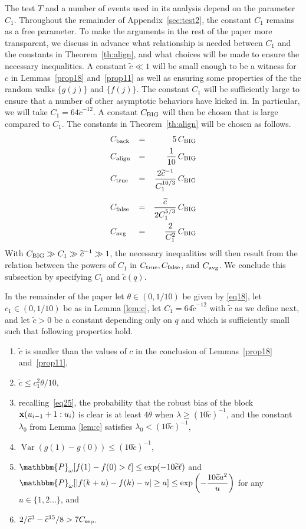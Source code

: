 \documentclass[final,12pt]{colt2018} %
\renewcommand{\P}{\mathbbm{P}}
\newcommand{\1}{\mathbf{1}}
\DeclareMathOperator{\Var}{Var}
\def\disp{\displaystyle}
\newcommand{\wt}{\widetilde}
\def\x{{\bf x}}
\def\csep{C_{\rm sep}} %
\def\cback{C_{\rm back}}
\def\calign{C_{\rm align}}
\def\ctrue{C_{\rm true}}
\def\cfalse{C_{\rm false}}
\def\cavg{C_{\rm avg}}
\def\ct{{\wt c}}
\def\chuge{C_{\rm BIG}}
\begin{document}
The test $T$ and a number of events used in its analysis depend on
the parameter $C_1$.  Throughout the remainder of Appendix~\ref{sec:test2},
the constant $C_1$ remains as a free parameter.  To make the arguments
in the rest of the paper more transparent, we discuss in advance what
relationship is needed between $C_1$ and the constants in
Theorem~\ref{th:align}, and what choices will be made to ensure the
necessary inequalities.
%
A constant $\ct \ll 1$ will be small enough to be a witness for $c$
in Lemmas~\ref{prop18} and~\ref{prop11} as well as ensuring some
properties of the the random walks $\{ g(j) \}$ and $\{ f(j) \}$.
The constant $C_1$ will be sufficiently large to ensure that a number
of other asymptotic behaviors have kicked in.  In particular, we will take
$C_1 = 64 \ct^{-12}$.  A constant $\chuge$ will then be chosen that is
large compared to $C_1$.  The constants in Theorem~\ref{th:align} will
be chosen as follows.
%
$$\begin{array}{lcr}
\cback & = & {\disp 5 \, \chuge} \\[1ex]
\calign & = & {\disp \frac{1}{10} \, \chuge } \\[2ex]
\ctrue & = & {\disp \frac{2 \ct^{-1}}{C_1^{10/3}} \, \chuge } \\[4ex]
\cfalse & = & {\disp \frac{\ct}{2 C_1^{5/3}} \, \chuge } \\[3ex]
\cavg & = & {\disp \frac{2}{C_1^2} \, \chuge }
\end{array}$$
With $\chuge \gg C_1 \gg \ct^{-1} \gg 1$, the necessary inequalities
will then result from the relation between the powers of $C_1$ in
$\ctrue, \cfalse$, and $\cavg$.
%
We conclude this subsection by specifying $C_1$ and $\ct (q)$.
%
\begin{definition} \label{def3}
	In the remainder of the paper let $\theta \in (0,1/10)$ be given by \eqref{eq18}, let $c_1\in(0,1/10)$ be as in Lemma \ref{lem:c}, let $C_1=64\wt c^{-12}$ with $\wt c$ as we define next, and let $\ct >0$ be a constant depending only on $q$ and which is sufficiently small such that following properties hold.
	\begin{enumerate}[$(i)$]
		\item $\ct$ is smaller than the values of $c$ in the conclusion of
		Lemmas~\ref{prop18} and~\ref{prop11},
		\label{rr:i}
		\item $\ct \leq c_1^2 \theta / 10$,
		\label{rr:ii}
		\item recalling~\eqref{eq25}, the probability that the robust bias
		of the block $\x (u_{i-1} + 1 : u_i)$ is clear is at least $4 \theta$
		when $\lambda \geq (10 \ct)^{-1}$, and the constant $\lambda_0$ from Lemma \ref{lem:c} satisfies $\lambda_0<(10\ct)^{-1}$,
		\label{rr:iii}
		\item $\Var(g(1) - g(0)) \leq (10 \ct)^{-1}$,
		\label{rr:iv}
		\item $\P_\omega [f(1)-f(0) > \ell] \leq \exp(-10 \ct \ell)$ and
		$\disp \P_\omega [|f(k + u) - f(k) - u| \geq a] \leq
		\exp \left (- \frac{10 \ct a^2}{u} \right )$ for any $u\in\{1,2\dots \}$, and
		\label{rr:v}
		\item $2 / \ct^3 - \ct^{15} / 8 > 7 \csep$.
		\label{rr:vi}
	\end{enumerate}
\end{definition}
\end{document}
